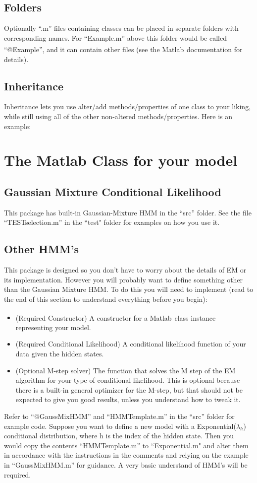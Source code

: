 \documentclass[]{scrreprt}
\newcommand{\Matlab}{Matlab\textsuperscript{\textregistered~}}
\begin{document}
\subsection{Folders}
Optionally ``.m'' files containing classes can be placed in separate folders
with corresponding names. For ``Example.m'' above this folder would be called
``@Example'', and it can contain other files (see the \Matlab documentation for
details).
\subsection{Inheritance}
Inheritance lets you use alter/add methods/properties of one class to your
liking, while still using all of the other non-altered methods/properties.
Here is an example:


\section{The Matlab Class for your model}
\subsection{Gaussian Mixture Conditional Likelihood}
This package has built-in Gaussian-Mixture HMM in the ``src'' folder. See the
file ``TESTselection.m'' in the ``test" folder for examples on how you use it.
\subsection{Other HMM's}
This package is designed so you don't have to worry about the details of EM or
its implementation. However you will probably want to define something other
than the Gaussian Mixture HMM. To do this you will need to implement (read to
the end of this section to understand everything before you begin):
\begin{itemize}
    \item(Required Constructor) A constructor for a \Matlab class instance
    representing your model.
    \item(Required Conditional Likelihood) A conditional likelihood function of
    your data given the hidden states.
    \item(Optional M-step solver) The function that solves the M step of the EM
    algorithm for your type of conditional likelihood. This is optional because
    there is a built-in general optimizer for the M-step, but that should not be expected
    to give you good results, unless you understand how to tweak it.
    
\end{itemize}
Refer to ``@GaussMixHMM'' and ``HMMTemplate.m'' in the
``src'' folder for example code. Suppose you want to define a new model with a
Exponential($\lambda_h$) conditional distribution, where h is the index of the
hidden state. Then you would copy the contents ``HMMTemplate.m'' to
``Exponential.m" and alter them in accordance with the instructions in the
comments and relying on the example in ``GaussMixHMM.m'' for guidance. A
very basic understand of HMM's will be required.
\end{document}

